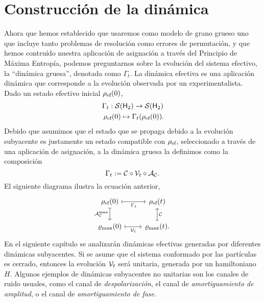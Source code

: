 \section{Construcción de la dinámica}\label{sec:ch2dycon}

Ahora que hemos establecido que usaremos como modelo de grano grueso uno que incluye tanto problemas de resolución como errores de permutación, y que hemos contruído nuestra aplicación de asignación a través del Principio de Máxima Entropía, podemos preguntarnos sobre la evolución del sistema efectivo, la ``dinámica gruesa'', denotada como $\Gamma_t$. La dinámica efectiva es una aplicación dinámica que corresponde a la evolución observada por un experimentalista. Dado un estado efectivo inicial $\rho_{\text{ef}}(0)$,
\begin{gather}
\Gamma_{t}:\mcS(\hilbert_2)\rightarrow \mcS(\hilbert_2)\nonumber\\
\rho_{\ef}(0) \mapsto \Gamma_{t}(\rho_{\ef}(0))\rlap{.}\nonumber
\end{gather}
Debido que asumimos que el estado que se propaga debido a la evolución subyacente es justamente un estado compatible con $\rho_{\text{ef}}$, seleccionado a través de una aplicación de asignación, a la dinámica gruesa la definimos como la composición
\begin{equation}
\Gamma_t:=\mathcal{C} \circ \mathcal{V}_t \circ \mathcal{A}_{\mathcal{C}}.\nonumber
\end{equation}
  El siguiente diagrama ilustra la ecuación anterior,
\[\begin{tikzcd}[arrows={<-|}]
    \rho_{\ef}(0)  & \rho_{\ef}(t) \arrow{l}{\Gamma_{t}} \arrow{d}{\mcC}\\
\varrho_{\max}(0) \arrow{u}{\mcA_{\mcC}^{\max}} & \varrho_{\max}(t). \arrow{l}{\mcV_{t}}
\end{tikzcd}
\]
En el siguiente capítulo se analizarán dinámicas efectivas generadas por diferentes dinámicas subyacentes. Si se asume que el sistema conformado por las partículas es cerrado, entonces la evolución $\mathcal{V}_{t}$ será unitaria, generada por un hamiltoniano $H$. Algunos ejemplos de dinámicas subyacentes no unitarias son los canales de ruido usuales, como el canal de \textit{despolarización}, el canal de \textit{amortiguamiento de amplitud}, o el canal de \textit{amortiguamiento de fase}. 

